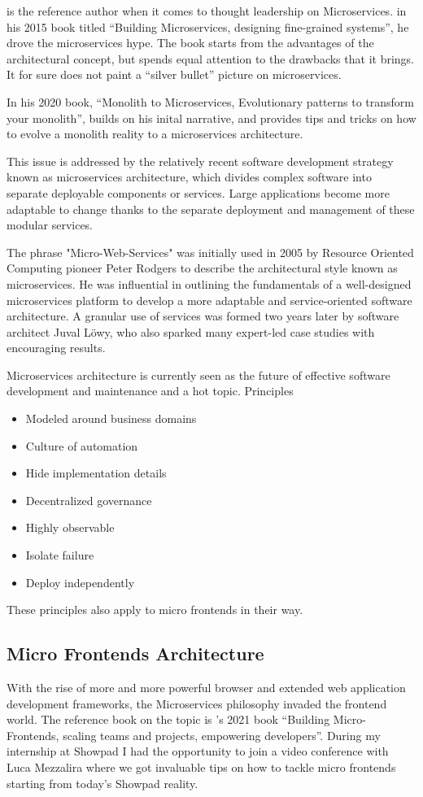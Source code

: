  is the reference author when it comes to thought leadership on Microservices. in his 2015 book titled ``Building Microservices, designing fine-grained systems'', he drove the microservices hype. The book starts from the advantages of the architectural concept, but spends equal attention to the drawbacks that it brings. It for sure does not paint a ``silver bullet'' picture on microservices.

In his 2020 book, ``Monolith to Microservices, Evolutionary patterns to transform your monolith'',   builds on his inital narrative, and provides tips and tricks on how to evolve a monolith reality to a microservices architecture.

This issue is addressed by the relatively recent software development strategy known as microservices architecture, which divides complex software into separate deployable components or services. Large applications become more adaptable to change thanks to the separate deployment and management of these modular services.

The phrase "Micro-Web-Services" was initially used in 2005 by Resource Oriented Computing pioneer Peter Rodgers to describe the architectural style known as microservices. He was influential in outlining the fundamentals of a well-designed microservices platform to develop a more adaptable and service-oriented software architecture. A granular use of services was formed two years later by software architect Juval Löwy, who also sparked many expert-led case studies with encouraging results.

Microservices architecture is currently seen as the future of effective software development and maintenance and a hot topic.
Principles
\begin{itemize}
    \item Modeled around business domains
    \item Culture of automation
    \item Hide implementation details
    \item Decentralized governance
    \item Highly observable
    \item Isolate failure
    \item Deploy independently
\end{itemize}
These principles also apply to micro frontends in their way.
\subsection{Micro Frontends Architecture}
With the rise of more and more powerful browser and extended web application development frameworks, the Microservices philosophy invaded the frontend world. The reference book on the topic is 's 2021 book ``Building Micro-Frontends, scaling teams and projects, empowering developers''. During my internship at Showpad I had the opportunity to join a video conference with Luca Mezzalira where we got invaluable tips on how to tackle micro frontends starting from today's Showpad reality.

